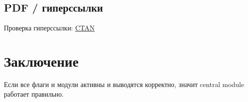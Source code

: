\documentclass[12pt]{memoir}
\begin{document}
	\section{PDF / гиперссылки}
	Проверка гиперссылки: \href{https://www.ctan.org}{CTAN}

	\chapter{Заключение}
	Если все флаги и модули активны и выводятся корректно, значит central module работает правильно.
\end{document}
